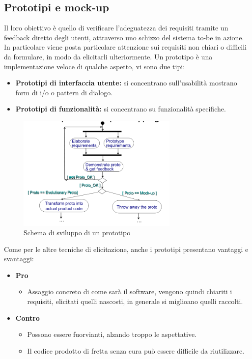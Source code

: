 \documentclass[../main.tex]{subfiles}
\begin{document}
\subsection{Prototipi e mock-up}
Il loro obiettivo è quello di verificare l'adeguatezza dei requisiti tramite un feedback diretto degli utenti, attraverso uno schizzo del sistema to-be in azione.
In particolare viene posta particolare attenzione sui requisiti non chiari o difficili da formulare, in modo da elicitarli ulteriormente.
Un prototipo è una implementazione veloce di qualche aspetto, vi sono due tipi:
\begin{itemize}
	\item \textbf{Prototipi di interfaccia utente:} si concentrano sull'usabilità mostrano form di i/o o pattern di dialogo.
	\item \textbf{Prototipi di funzionalità:} si concentrano su funzionalità specifiche.
\end{itemize}
\begin{figure}[h]
	\centering
	\includegraphics[width=0.7\textwidth]{pictures/schemaPrototipo.png}
	\caption{Schema di sviluppo di un prototipo}
\end{figure}
Come per le altre tecniche di elicitazione, anche i prototipi presentano vantaggi e svantaggi:
\begin{itemize}
	\item \textbf{Pro}
	\begin{itemize}
		\item Assaggio concreto di come sarà il software, vengono quindi chiariti i requisiti, elicitati quelli nascosti, in generale si miglioano quelli raccolti.
	\end{itemize}
	\item \textbf{Contro}
	\begin{itemize}
		\item Possono essere fuorvianti, alzando troppo le aspettative.
		\item Il codice prodotto di fretta senza cura può essere difficile da riutilizzare. 
		\end{itemize}
\end{itemize}
\end{document}
